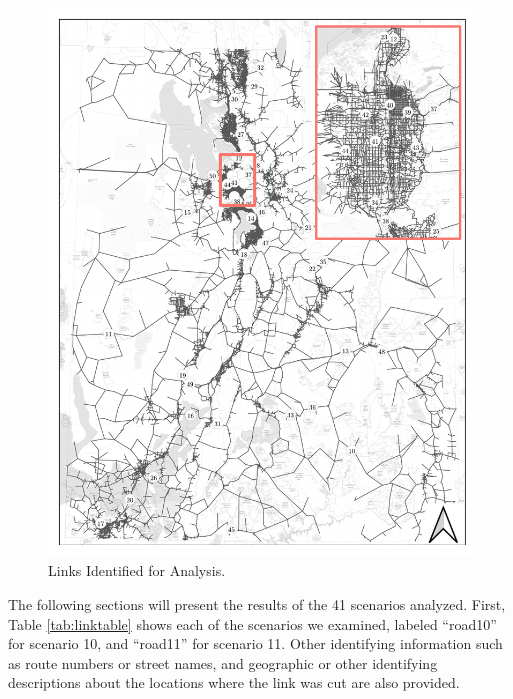\begin{figure}

{\centering \includegraphics[width=0.75\linewidth]{figures/chapter4/resiliency_links_map.pdf}

}

\caption{Links Identified for Analysis.}\label{fig:linksmap}
\end{figure}

The following sections will present the results of the 41 scenarios analyzed. First,
Table \ref{tab:linktable} shows each of the scenarios we examined, labeled “road10”
for scenario 10, and “road11” for scenario 11. Other identifying information such as
route numbers or street names, and geographic or other identifying descriptions about
the locations where the link was cut are also provided.

